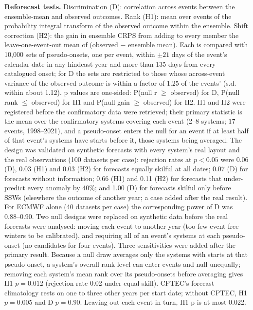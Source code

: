 \documentclass[11pt]{article}
\begin{document}
\textbf{Reforecast tests.} Discrimination (D): correlation across events between the ensemble-mean and observed outcomes. Rank (H1): mean over events of the probability integral transform of the observed outcome within the ensemble. Shift correction (H2): the gain in ensemble CRPS from adding to every member the leave-one-event-out mean of (observed $-$ ensemble mean). Each is compared with 10,000 sets of pseudo-onsets, one per event, within $\pm21$ days of the event's calendar date in any hindcast year and more than 135 days from every catalogued onset; for D the sets are restricted to those whose across-event variance of the observed outcome is within a factor of 1.25 of the events' (s.d. within about 1.12). p values are one-sided: P(null r $\ge$ observed) for D, P(null rank $\le$ observed) for H1 and P(null gain $\ge$ observed) for H2. H1 and H2 were registered before the confirmatory data were retrieved; their primary statistic is the mean over the confirmatory systems covering each event (2–8 systems; 17 events, 1998–2021), and a pseudo-onset enters the null for an event if at least half of that event's systems have starts before it, those systems being averaged. The design was validated on synthetic forecasts with every system's real layout and the real observations (100 datasets per case): rejection rates at $p < 0.05$ were 0.06 (D), 0.03 (H1) and 0.03 (H2) for forecasts equally skilful at all dates; 0.07 (D) for forecasts without information; 0.66 (H1) and 0.11 (H2) for forecasts that under-predict every anomaly by 40\%; and 1.00 (D) for forecasts skilful only before SSWs (elsewhere the outcome of another year; a case added after the real result). For ECMWF alone (40 datasets per case) the corresponding power of D was 0.88–0.90. Two null designs were replaced on synthetic data before the real forecasts were analysed: moving each event to another year (too few event-free winters to be calibrated), and requiring all of an event's systems at each pseudo-onset (no candidates for four events). Three sensitivities were added after the primary result. Because a null draw averages only the systems with starts at that pseudo-onset, a system's overall rank level can enter events and null unequally; removing each system's mean rank over its pseudo-onsets before averaging gives H1 $p = 0.012$ (rejection rate 0.02 under equal skill). CPTEC's forecast climatology rests on one to three other years per start date; without CPTEC, H1 $p = 0.005$ and D $p = 0.90.$ Leaving out each event in turn, H1 p is at most 0.022.
\end{document}
